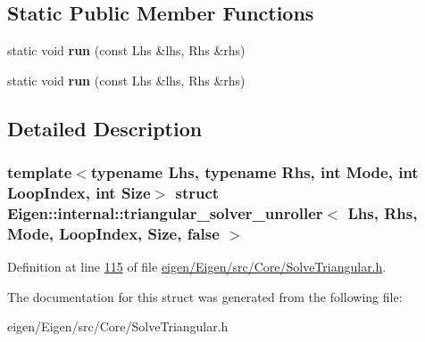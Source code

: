 \subsection*{Static Public Member Functions}
\begin{DoxyCompactItemize}
\item 
\mbox{\label{struct_eigen_1_1internal_1_1triangular__solver__unroller_3_01_lhs_00_01_rhs_00_01_mode_00_01_looefec01585c67928d42a9958d8c8f161e_a01b18f6c3a53d6b6f11763d3618b83c0}} 
static void {\bfseries run} (const Lhs \&lhs, Rhs \&rhs)
\item 
\mbox{\label{struct_eigen_1_1internal_1_1triangular__solver__unroller_3_01_lhs_00_01_rhs_00_01_mode_00_01_looefec01585c67928d42a9958d8c8f161e_a01b18f6c3a53d6b6f11763d3618b83c0}} 
static void {\bfseries run} (const Lhs \&lhs, Rhs \&rhs)
\end{DoxyCompactItemize}


\subsection{Detailed Description}
\subsubsection*{template$<$typename Lhs, typename Rhs, int Mode, int Loop\+Index, int Size$>$\newline
struct Eigen\+::internal\+::triangular\+\_\+solver\+\_\+unroller$<$ Lhs, Rhs, Mode, Loop\+Index, Size, false $>$}



Definition at line \hyperlink{eigen_2_eigen_2src_2_core_2_solve_triangular_8h_source_l00115}{115} of file \hyperlink{eigen_2_eigen_2src_2_core_2_solve_triangular_8h_source}{eigen/\+Eigen/src/\+Core/\+Solve\+Triangular.\+h}.



The documentation for this struct was generated from the following file\+:\begin{DoxyCompactItemize}
\item 
eigen/\+Eigen/src/\+Core/\+Solve\+Triangular.\+h\end{DoxyCompactItemize}

